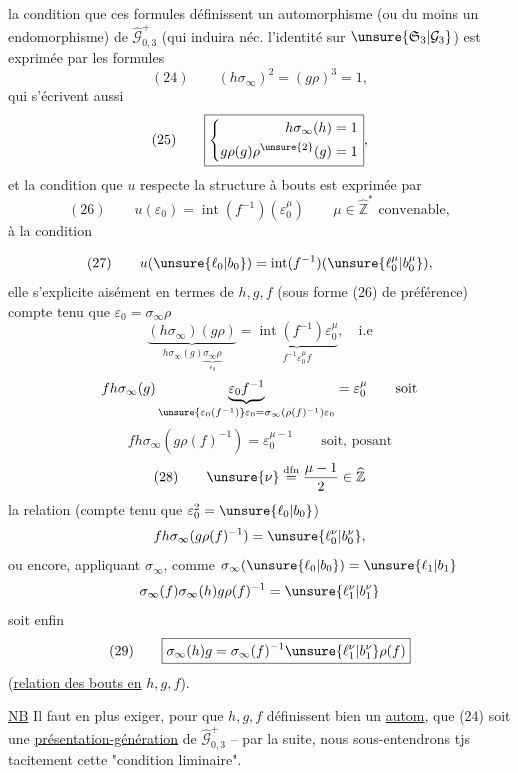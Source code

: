 la condition que ces formules définissent un automorphisme (ou du moins un endomorphisme) de $\widehat{\mathcal G}_{0,3}^{+}$ (qui induira néc. l'identité sur $\unsure{\mathfrak S_3|\mathcal G_3}$) est exprimée par les formules
\[
(24)\qquad (h\sigma_\infty)^{2}=(g\rho)^{3}=1,
\]
qui s'écrivent aussi
\[
(25)\qquad
\boxed{\left\{\begin{aligned}
h\sigma_\infty(h)&=1\\
g\rho(g)\rho^{\unsure{2}}(g)&=1
\end{aligned}\right.},
\]
et la condition que $u$ respecte la structure à bouts est exprimée par
\[
(26)\qquad u(\varepsilon_0)=\operatorname{int}(f^{-1})(\varepsilon_0^{\mu})
\qquad \mu\in\widehat{\mathbb Z}^{*}\text{ convenable},
\]
 à la condition


\[
(27)\qquad
u(\unsure{\ell_0|b_0})=\operatorname{int}(f^{-1})(\unsure{\ell_0^{\mu}|b_0^{\mu}}),
\]
elle s'explicite aisément en termes de $h,g,f$ (sous forme (26) de préférence) compte tenu que $\varepsilon_0=\sigma_\infty\rho$
\[
\underbrace{(h\sigma_\infty)(g\rho)}_{h\sigma_\infty(g)\underbrace{\sigma_\infty\rho}_{\varepsilon_0}}
=\underbrace{\operatorname{int}(f^{-1})\varepsilon_0^{\mu}}_{f^{-1}\varepsilon_0^{\mu}f},\quad\text{i.e}
\]
\[
f h\sigma_\infty(g)\underbrace{\varepsilon_0 f^{-1}}_{\unsure{\varepsilon_0(f^{-1})}\varepsilon_0=\sigma_\infty(\rho(f)^{-1})\varepsilon_0}
=\varepsilon_0^{\mu}\qquad\text{soit}
\]
\[
f h\sigma_\infty(g\rho(f)^{-1})=\varepsilon_0^{\mu-1}
\qquad\text{soit, posant}
\]
\[
(28)\qquad \unsure{\nu}\overset{\mathrm{dfn}}{=}\frac{\mu-1}{2}\in\widehat{\mathbb Z}
\]
la relation (compte tenu que $\varepsilon_0^{2}=\unsure{\ell_0|b_0}$)
\[
f h\sigma_\infty(g\rho(f)^{-1})=\unsure{\ell_0^{\nu}|b_0^{\nu}},
\]
ou encore, appliquant $\sigma_\infty$, comme $\sigma_\infty(\unsure{\ell_0|b_0})=\unsure{\ell_1|b_1}$
\[
\sigma_\infty(f)\sigma_\infty(h)g\rho(f)^{-1}=\unsure{\ell_1^{\nu}|b_1^{\nu}}
\]
soit enfin
\[
(29)\qquad
\boxed{\sigma_\infty(h)g=\sigma_\infty(f)^{-1}\unsure{\ell_1^{\nu}|b_1^{\nu}}\rho(f)}
\]
(\uline{relation des bouts en} $h,g,f$).


\uline{NB} Il faut en plus exiger, pour que $h,g,f$ définissent bien un \uline{autom}, que (24) soit une \uline{présentation-génération} de $\widehat{\mathcal G}_{0,3}^{+}$ -- par la suite, nous sous-entendrons tjs tacitement cette "condition liminaire".
